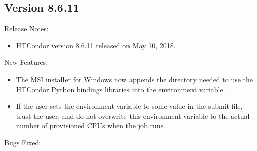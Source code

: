 \subsection*{\label{sec:New-8-6-11}Version 8.6.11}

\noindent Release Notes:

\begin{itemize}

\item HTCondor version 8.6.11 released on May 10, 2018.

\end{itemize}


\noindent New Features:

\begin{itemize}

\item The MSI installer for Windows now appends the directory needed to use the
HTCondor Python bindings libraries into the  environment variable.

\item If the user sets the environment variable  to some value
in the submit file, trust the user, and do not overwrite this environment
variable to the actual number of provisioned CPUs when the job runs.

\end{itemize}

\noindent Bugs Fixed:

